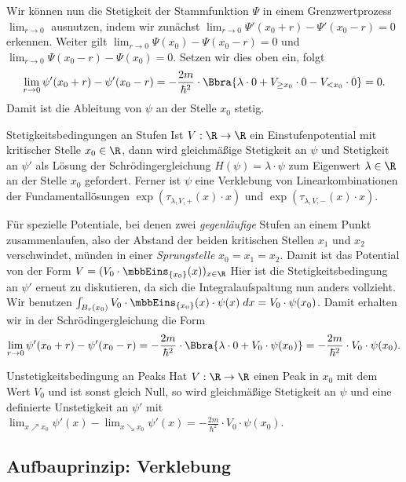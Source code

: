 \documentclass{subfiles}
\begin{document}
        Wir können nun die Stetigkeit der Stammfunktion $\Psi$ in einem Grenzwertprozess $\lim_{r\to 0}$ ausnutzen, indem wir zunächst $\lim_{r\to 0}\Psi'(x_0 + r) - \Psi'(x_0 - r) = 0$ erkennen. Weiter gilt $\lim_{r\to 0}\Psi(x_0) - \Psi(x_0 - r) = 0$ und $\lim_{r\to 0}\Psi(x_0 - r) - \Psi(x_0) = 0$. Setzen wir dies oben ein, folgt 
        \[
            \lim_{r\to 0}\psi'(x_0 + r)-\psi'(x_0 - r) = -\frac{2m}{\hbar^2}\cdot\Bbra{
                \lambda\cdot 0 + V_{\geq x_0}\cdot 0 - V_{<x_0}\cdot 0
            } = 0.
        \]
        Damit ist die Ableitung von $\psi$ an der Stelle $x_0$ stetig.

        \begin{mdef}{Stetigkeitsbedingungen an Stufen}
            Ist $V:\R\to\R$ ein Einstufenpotential mit kritischer Stelle $x_0\in\R$, dann wird gleichmäßige Stetigkeit an $\psi$ und Stetigkeit an $\psi'$ als Lösung der Schrödingergleichung $H(\psi) = \lambda\cdot\psi$ zum Eigenwert $\lambda\in\R$ an der Stelle $x_0$ gefordert. Ferner ist $\psi$ eine Verklebung von Linearkombinationen der Fundamentallösungen $\exp(\tau_{\lambda,V,+}(x)\cdot x)$ und $\exp(\tau_{\lambda,V,-}(x)\cdot x)$. 
        \end{mdef}
        Für spezielle Potentiale, bei denen zwei \emph{gegenläufige} Stufen an einem Punkt zusammenlaufen, also der Abstand der beiden kritischen Stellen $x_1$ und $x_2$ verschwindet, münden in einer \emph{Sprungstelle} $x_0 = x_1 = x_2$. Damit ist das Potential von der Form $V = (V_0\cdot\mbbEins_{\{x_0\}}(x))_{x\in\R}$ Hier ist die Stetigkeitsbedingung an $\psi'$ erneut zu diskutieren, da sich die Integralaufspaltung nun anders vollzieht. Wir benutzen $\int_{B_r(x_0)} V_0\cdot\mbbEins_{\{x_0\}}(x)\cdot\psi(x)\;dx = V_0\cdot\psi(x_0)$. Damit erhalten wir in der Schrödingergleichung die Form
        \[
            \lim_{r\to 0}\psi'(x_0 + r)-\psi'(x_0 - r) = -\frac{2m}{\hbar^2}\cdot\Bbra{
                \lambda\cdot 0 + V_0\cdot\psi(x_0)
            } = -\frac{2m}{\hbar^2}\cdot V_0\cdot\psi(x_0).
        \]
        \begin{mdef}{Unstetigkeitsbedingung an Peaks}
            Hat $V:\R\to\R$ einen Peak in $x_0$ mit dem Wert $V_0$ und ist sonst gleich Null, so wird gleichmäßige Stetigkeit an $\psi$ und eine definierte Unstetigkeit an $\psi'$ mit $\lim_{x\nearrow x_0}\psi'(x) - \lim_{x\searrow x_0}\psi'(x) = -\frac{2m}{\hbar^2}\cdot V_0\cdot\psi(x_0)$.
        \end{mdef}

    \subsection{Aufbauprinzip: Verklebung}
        
\end{document}
